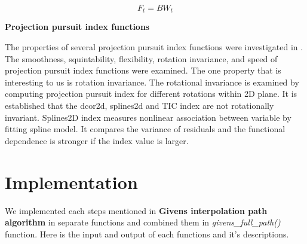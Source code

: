 \[F_t = B  W_t\]

\textbf{Projection pursuit index functions}

The properties of several projection pursuit index functions were
investigated in \citet{pp}. The smoothness, squintability, flexibility,
rotation invariance, and speed of projection pursuit index functions
were examined. The one property that is interesting to us is rotation
invariance. The rotational invariance is examined by computing
projection pursuit index for different rotations within 2D plane. It is
established that the dcor2d, splines2d and TIC index are not
rotationally invariant. Splines2D index measures nonlinear association
between variable by fitting spline model. It compares the variance of
residuals and the functional dependence is stronger if the index value
is larger.

\hypertarget{implementation}{%
\section{Implementation}\label{implementation}}

We implemented each steps mentioned in \textbf{Givens interpolation path
algorithm} in separate functions and combined them in
\emph{givens\_full\_path()} function. Here is the input and output of
each functions and it's descriptions.


